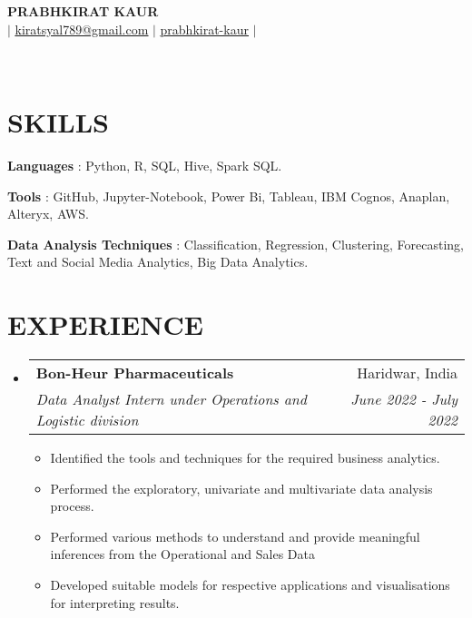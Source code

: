 \documentclass[letterpaper,10pt]{article}
\makeatletter
\newcommand{\resumeItemHead}[2]{
  \item\small{
    \textbf{#1}{#2 \vspace{-2pt}}
  }
}
\newcommand{\resumeSubheading}[4]{
  \vspace{-1pt}\item
    \begin{tabular*}{0.97\textwidth}[t]{l@{\extracolsep{\fill}}r}
      \textbf{#1} & #2 \\
      \textit{\small#3} & \textit{\small #4} \\
    \end{tabular*}\vspace{-5pt}
}
\newcommand{\resumeSubHeadingListStart}{\begin{itemize}[leftmargin=*]}
\newcommand{\resumeSubHeadingListEnd}{\end{itemize}}
\newcommand{\resumeItemListStart}{\begin{itemize}}
\newcommand{\resumeItemListEnd}{\end{itemize}\vspace{-5pt}}
\makeatother
\begin{document}
\begin{center}
    \textbf{\Large\scshape PRABHKIRAT KAUR} \\ \vspace{2pt}
    \small {} $|$ 
    \faEnvelope \hspace{2pt} \href{mailto:kiratsyal789@gmail.com}{\color{black} \underline {kiratsyal789@gmail.com}} $|$ 
    \faLinkedin \hspace{2pt}\href{www.linkedin.com/in/prabhkirat-kaur/} {\color{black} \underline{prabhkirat-kaur}} \hspace{1pt} $|$ 
    \address{ Bengaluru,Karnataka}\\
\end{center}
\vspace{-15pt}

\section{SKILLS}
\begin{itemize}[leftmargin=0in, label={}]
\vspace{2pt}
    \small{
    \item {
        \textbf{Languages} {: Python, R, SQL, Hive, Spark SQL.} \vspace{2pt} \\}
    \item {
        \textbf{Tools} {: GitHub, Jupyter-Notebook, Power Bi, Tableau, IBM Cognos, Anaplan, Alteryx, AWS.}\vspace{2pt} \\}
    \item {
        \textbf{Data Analysis Techniques} {: Classification, Regression, Clustering, Forecasting, Text and Social Media Analytics, Big Data Analytics.}\vspace{2pt} \\}
    }
\end{itemize} 

\section{EXPERIENCE}
  \resumeSubHeadingListStart
    \resumeSubheading
    {Bon-Heur Pharmaceuticals}{Haridwar, India}
    {Data Analyst Intern under Operations and Logistic division }{June 2022 - July 2022}
        \resumeItemListStart
        \vspace{-2pt}
            \resumeItemHead{}{Identified the tools and techniques for the required business analytics.} 
            \resumeItemHead{}{Performed the exploratory, univariate and multivariate data analysis process.} 
            \resumeItemHead{}{Performed various methods to understand and provide meaningful inferences from the Operational and Sales Data}
            \resumeItemHead{}{Developed suitable models for respective applications and visualisations for interpreting results.}
        \resumeItemListEnd
    \resumeSubHeadingListEnd
\end{document}
